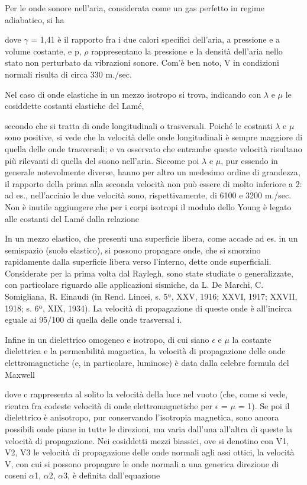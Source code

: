 \documentclass[a4paper]{article}
\begin{document}
Per le onde sonore nell'aria, considerata come un gas perfetto in regime adiabatico, si ha

dove $\gamma$ = 1,41 è il rapporto fra i due calori specifici dell'aria, a pressione e a volume costante, e p, $\rho$ rappresentano la pressione e la densità dell'aria nello stato non perturbato da vibrazioni sonore. Com'è ben noto, V in condizioni normali risulta di circa 330 m./sec.

Nel caso di onde elastiche in un mezzo isotropo si trova, indicando con $\lambda$ e $\mu$ le cosiddette costanti elastiche del Lamé,

secondo che si tratta di onde longitudinali o trasversali. Poiché le costanti $\lambda$ e $\mu$ sono positive, si vede che la velocità delle onde longitudinali è sempre maggiore di quella delle onde trasversali; e va osservato che entrambe queste velocità risultano più rilevanti di quella del suono nell'aria. Siccome poi $\lambda$ e $\mu$, pur essendo in generale notevolmente diverse, hanno per altro un medesimo ordine di grandezza, il rapporto della prima alla seconda velocità non può essere di molto inferiore a 2: ad es., nell'acciaio le due velocità sono, rispettivamente, di 6100 e 3200 m./sec. Non è inutile aggiungere che per i corpi isotropi il modulo dello Young è legato alle costanti del Lamé dalla relazione

In un mezzo elastico, che presenti una superficie libera, come accade ad es. in un semispazio (suolo elastico), si possono propagare onde, che si smorzino rapidamente dalla superficie libera verso l'interno, dette onde superficiali. Considerate per la prima volta dal Raylegh, sono state studiate o generalizzate, con particolare riguardo alle applicazioni sismiche, da L. De Marchi, C. Somigliana, R. Einaudi (in Rend. Lincei, s. 5ª, XXV, 1916; XXVI, 1917; XXVII, 1918; s. 6ª, XIX, 1934). La velocità di propagazione di queste onde è all'incirca eguale ai 95/100 di quella delle onde trasversal i.

Infine in un dielettrico omogeneo e isotropo, di cui siano $\epsilon$ e $\mu$ la costante dielettrica e la permeabilità magnetica, la velocità di propagazione delle onde elettromagnetiche (e, in particolare, luminose) è data dalla celebre formula del Maxwell

dove c rappresenta al solito la velocità della luce nel vuoto (che, come si vede, rientra fra codeste velocità di onde elettromagnetiche per $\epsilon$ = $\mu$ = 1). Se poi il dielettrico è anisotropo, pur conservando l'isotropia magnetica, sono ancora possibili onde piane in tutte le direzioni, ma varia dall'una all'altra di queste la velocità di propagazione. Nei cosiddetti mezzi biassici, ove si denotino con V1, V2, V3 le velocità di propagazione delle onde normali agli assi ottici, la velocità V, con cui si possono propagare le onde normali a una generica direzione di coseni $\alpha$1, $\alpha$2, $\alpha$3, è definita dall'equazione
\end{document}
